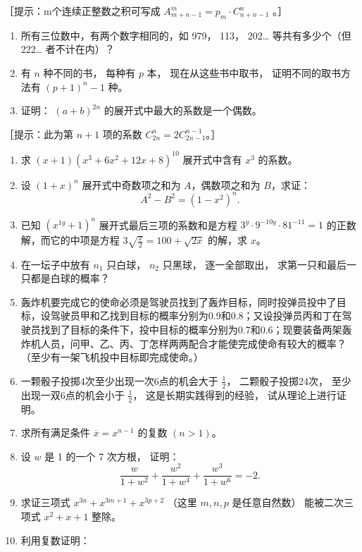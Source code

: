 ［提示：m个连续正整数之积可写成
\(A_{m+n-1}^{m}=p_{m}\cdot C_{n+n-1}^{n}\) 。］

\begin{enumerate}[start=7]
\item
  所有三位数中，有两个数字相同的，如 979， 113， 202\ldots{}
  等共有多少个（但 222\ldots{} 者不计在内）？
\item
  有 \(n\) 种不同的书， 每种有 \(p\) 本， 现在从这些书中取书，
  证明不同的取书方法有 \((p + 1)^n - 1\) 种。
\item
  证明： \((a+b)^{2n}\) 的展开式中最大的系数是一个偶数。
\end{enumerate}

［提示：此为第 \(n + 1\) 项的系数
\(C_{2n}^{n} = 2C_{2n - 1}^{n - 1}\)。］

\begin{enumerate}[start=10]
\item
  求 \((x + 1)(x^3 + 6x^2 + 12x + 8)^{10}\) 展开式中含有 \(x^3\)
  的系数。
\item
  设 \((1 + x)^n\) 展开式中奇数项之和为 \(A\)，偶数项之和为
  \(B\)，求证：
\[
A ^ {2} - B ^ {2} = (1 - x ^ {2}) ^ {n}.
\]
\item
  已知 \((x^{1g} + 1)^n\) 展开式最后三项的系数和是方程
  \(3^{y} \cdot 9^{-10y} \cdot 81^{-11} = 1\) 的正数解，而它的中项是方程
  \(3\sqrt{\frac{x}{2}} = 100 + \sqrt{2x}\) 的解，求 \(x\)。
\item
  在一坛子中放有 \(n_1\) 只白球， \(n_2\) 只黑球， 逐一全部取出，
  求第一只和最后一只都是白球的概率？
\item
  轰炸机要完成它的使命必须是驾驶员找到了轰炸目标，同时投弹员投中了目标，设驾驶员甲和乙找到目标的概率分别为0.9和0.8；又设投弹员丙和丁在驾驶员找到了目标的条件下，投中目标的概率分别为0.7和0.6；现要装备两架轰炸机人员，问甲、乙、丙、丁怎样两两配合才能使完成使命有较大的概率？（至少有一架飞机投中目标即完成使命。）
\item
  一颗骰子投掷4次至少出现一次6点的机会大于 \(\frac{1}{2}\)，
  二颗骰子投掷24次， 至少出现一双6点的机会小于 \(\frac{1}{2}\)，
  这是长期实践得到的经验， 试从理论上进行证明。
\item
  求所有满足条件 \(\overline{x} = x^{n - 1}\) 的复数 \((n > 1)\)。
\item
  设 \(w\) 是 1 的一个 7 次方根， 证明：
\[
\frac {w}{1 + w ^ {2}} + \frac {w ^ {2}}{1 + w ^ {4}} + \frac {w ^ {3}}{1 + w ^ {6}} = - 2.
\]
\item
  求证三项式 \(x^{3n} + x^{3m+1} + x^{3p+2}\) （这里 \(m, n, p\)
  是任意自然数） 能被二次三项式 \(x^{2} + x + 1\) 整除。
\item
  利用复数证明：
\end{enumerate}

